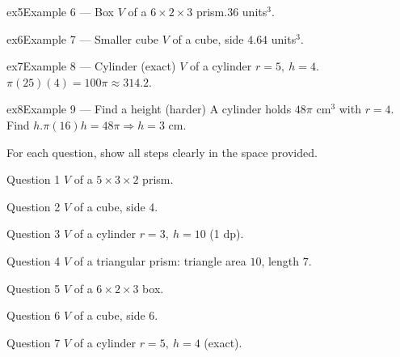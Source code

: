 \documentclass[11pt]{article}
\begin{document}
\begin{example}{ex5}{Example 6 --- Box}
$V$ of a $6\times2\times3$ prism.\soln $36$ units$^3$.
\end{example}

\begin{example}{ex6}{Example 7 --- Smaller cube}
$V$ of a cube, side $4$.\soln $64$ units$^3$.
\end{example}

\begin{example}{ex7}{Example 8 --- Cylinder (exact)}
$V$ of a cylinder $r=5,\ h=4$.\soln $\pi(25)(4)=100\pi\approx314.2$.
\end{example}

\begin{example}{ex8}{Example 9 --- Find a height (harder)}
A cylinder holds $48\pi$ cm$^3$ with $r=4$. Find $h$.\soln $\pi(16)h=48\pi\Rightarrow h=3$ cm.
\end{example}

\clearpage
{}
For each question, show all steps clearly in the space provided.

\begin{qbox}{Question 1}
$V$ of a $5\times3\times2$ prism.\workspace{1.8cm}
\end{qbox}

\begin{qbox}{Question 2}
$V$ of a cube, side $4$.\workspace{1.8cm}
\end{qbox}

\begin{qbox}{Question 3}
$V$ of a cylinder $r=3,\ h=10$ (1 dp).\workspace{2.2cm}
\end{qbox}

\begin{qbox}{Question 4}
$V$ of a triangular prism: triangle area $10$, length $7$.\workspace{2.0cm}
\end{qbox}

\begin{qbox}{Question 5}
$V$ of a $6\times2\times3$ box.\workspace{1.8cm}
\end{qbox}

\begin{qbox}{Question 6}
$V$ of a cube, side $6$.\workspace{1.8cm}
\end{qbox}

\begin{qbox}{Question 7}
$V$ of a cylinder $r=5,\ h=4$ (exact).\workspace{2.0cm}
\end{qbox}
\end{document}
